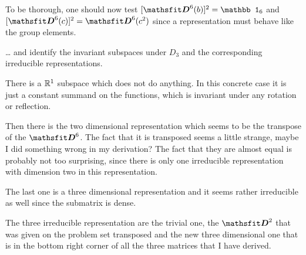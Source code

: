 \documentclass[11pt, english, fleqn, DIV=15, headinclude, BCOR=1cm]{scrartcl}
\begin{document}
To be thorough, one should now test $[\tens D^6(b)]^2 = \mathbb 1_6$ and
$[\tens D^6(c)]^2 = \tens D^6(c^2)$ since a representation must behave like the
group elements.

\begin{problem}
    … and identify the invariant subspaces under $D_3$ and the corresponding
    irreducible representations.
\end{problem}

There is a $\mathbb R^1$ subspace which does not do anything. In this concrete case it
is just a constant summand on the functions, which is invariant under any
rotation or reflection.

Then there is the two dimensional representation which seems to be the
transpose of the $\tens D^6$. The fact that it is transposed seems a little
strange, maybe I did something wrong in my derivation? The fact that they are
almost equal is probably not too surprising, since there is only one
irreducible representation with dimension two in this representation.

The last one is a three dimensional representation and it seems rather
irreducible as well since the submatrix is dense.

The three irreducible representation are the trivial one, the $\tens D^2$ that
was given on the problem set transposed and the new three dimensional one that
is in the bottom right corner of all the three matrices that I have derived.
\end{document}

